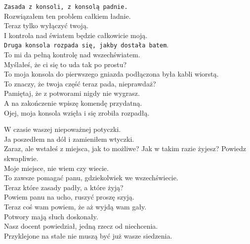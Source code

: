 \charszam{}
\texttt{Zasada z konsoli, z konsolą padnie.}\\
Rozwiązałem ten problem całkiem ładnie.\\
Teraz tylko wyłączyć twoją.\\
I kontrola nad światem będzie całkowicie moją.\\
\texttt{Druga konsola rozpada się, jakby dostała batem}.\\
To mi da pełną kontrolę nad wszechświatem.\\

\charfer{}
Myślałeś, że ci się to uda tak po prostu?\\
To moja konsola do pierwszego gniazda podłączona była kabli wiorstą.\\
To znaczy, że twoja część teraz pada, nieprawdaż?\\
Pamiętaj, że z potworami nigdy nie wygrasz.\\
A na zakończenie wpiszę komendę przydatną.\\
Ojej, moja konsola wzięła i się zrobiła rozpadłą.\\


\charprzy{}
W czasie waszej niepoważnej potyczki.\\
Ja poszedłem na dół i zamieniłem wtyczki.\\

\charszam{}
Zaraz, ale wstałeś z miejsca, jak to możliwe?
Jak w takim razie żyjesz? Powiedz skwapliwie.\\

\charprzy{}
Moje miejsce, nie wiem czy wiecie.\\
To zawsze pomagać panu, gdziekolwiek we wszechświecie.\\
Teraz które zasady padły, a które żyją?\\
Powiem panu na ucho, ruszyć proszę szyją.\\

\charfer{}
Teraz coś wam powiem, że aż wyjdą wam gały.\\
Potwory mają słuch doskonały.\\
Nasz docent powiedział, jedną rzecz od niechcenia.\\
Przyklejone na stałe nie muszą być już wasze siedzenia.\\



